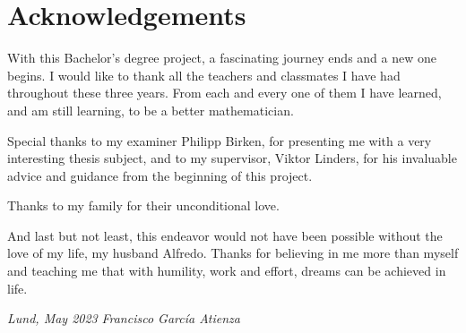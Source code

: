 
\chapter*{Acknowledgements}

		


With this Bachelor's degree project, a fascinating journey ends and a new one begins. I would like to thank all the teachers and classmates I have had throughout these three years. From each and every one of them I have learned, and am still learning, to be a better mathematician.

Special thanks to my examiner Philipp Birken, for presenting me with a very interesting thesis subject, and to my supervisor, Viktor Linders, for his invaluable advice and guidance from the beginning of this project. 

Thanks to my family for their unconditional love.

And last but not least, this endeavor would not have been possible without the love of my life, my husband Alfredo. Thanks for believing in me more than myself and teaching me that with humility, work and effort, dreams can be achieved in life.

\addvspace{1.3cm}

\textit{Lund, May 2023} \hfill \textit{Francisco García Atienza}









